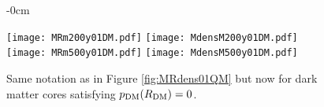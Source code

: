 \documentclass[universe,article,accept,moreauthors,pdftex]{Definitions/mdpi}
\begin{document}
\begin{figure} [H]\ContinuedFloat


\begin{adjustwidth}{-\extralength}{0cm}
\centering %

{\texttt{[image: MRm200y01DM.pdf]}\vspace{3pt}
	  \texttt{[image: MdensM200y01DM.pdf]}}\\\vspace{5pt}
{\texttt{[image: MRm500y01DM.pdf]}\vspace{3pt}
	  \texttt{[image: MdensM500y01DM.pdf]}}
\end{adjustwidth}
\caption{Same notation as in Figure \ref{fig:MRdens01QM} but now for dark matter cores satisfying $p_{\rm DM}(R_{\rm DM})=0$.}
\label{fig:MRdens01DM}%


\end{figure}

\end{document}
